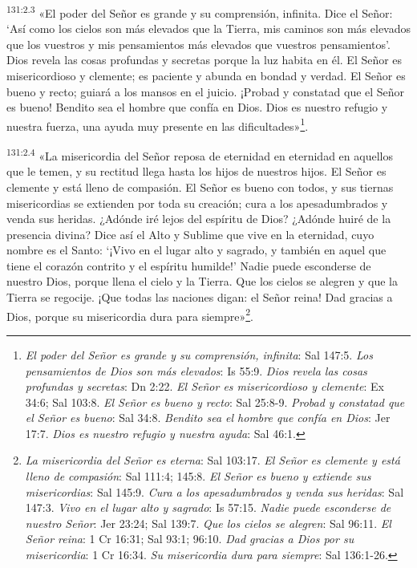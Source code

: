 \par
\textsuperscript{131:2.3} «El poder del Señor es grande y su comprensión, infinita. Dice el Señor: `Así como los cielos son más elevados que la Tierra, mis caminos son más elevados que los vuestros y mis pensamientos más elevados que vuestros pensamientos'. Dios revela las cosas profundas y secretas porque la luz habita en él. El Señor es misericordioso y clemente; es paciente y abunda en bondad y verdad. El Señor es bueno y recto; guiará a los mansos en el juicio. ¡Probad y constatad que el Señor es bueno! Bendito sea el hombre que confía en Dios. Dios es nuestro refugio y nuestra fuerza, una ayuda muy presente en las dificultades»\footnote{\textit{El poder del Señor es grande y su comprensión, infinita}: Sal 147:5. \textit{Los pensamientos de Dios son más elevados}: Is 55:9. \textit{Dios revela las cosas profundas y secretas}: Dn 2:22. \textit{El Señor es misericordioso y clemente}: Ex 34:6; Sal 103:8. \textit{El Señor es bueno y recto}: Sal 25:8-9. \textit{Probad y constatad que el Señor es bueno}: Sal 34:8. \textit{Bendito sea el hombre que confía en Dios}: Jer 17:7. \textit{Dios es nuestro refugio y nuestra ayuda}: Sal 46:1.}.

\par
\textsuperscript{131:2.4} «La misericordia del Señor reposa de eternidad en eternidad en aquellos que le temen, y su rectitud llega hasta los hijos de nuestros hijos. El Señor es clemente y está lleno de compasión. El Señor es bueno con todos, y sus tiernas misericordias se extienden por toda su creación; cura a los apesadumbrados y venda sus heridas. ¿Adónde iré lejos del espíritu de Dios? ¿Adónde huiré de la presencia divina? Dice así el Alto y Sublime que vive en la eternidad, cuyo nombre es el Santo: `¡Vivo en el lugar alto y sagrado, y también en aquel que tiene el corazón contrito y el espíritu humilde!' Nadie puede esconderse de nuestro Dios, porque llena el cielo y la Tierra. Que los cielos se alegren y que la Tierra se regocije. ¡Que todas las naciones digan: el Señor reina! Dad gracias a Dios, porque su misericordia dura para siempre»\footnote{\textit{La misericordia del Señor es eterna}: Sal 103:17. \textit{El Señor es clemente y está lleno de compasión}: Sal 111:4; 145:8. \textit{El Señor es bueno y extiende sus misericordias}: Sal 145:9. \textit{Cura a los apesadumbrados y venda sus heridas}: Sal 147:3. \textit{Vivo en el lugar alto y sagrado}: Is 57:15. \textit{Nadie puede esconderse de nuestro Señor}: Jer 23:24; Sal 139:7. \textit{Que los cielos se alegren}: Sal 96:11. \textit{El Señor reina}: 1 Cr 16:31; Sal 93:1; 96:10. \textit{Dad gracias a Dios por su misericordia}: 1 Cr 16:34. \textit{Su misericordia dura para siempre}: Sal 136:1-26.}.

